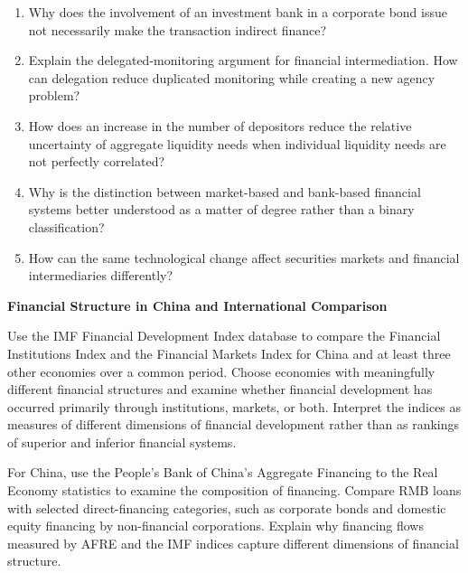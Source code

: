 \begin{enumerate}

\item Why does the involvement of an investment bank in a corporate bond issue not necessarily make the transaction indirect finance?

\item Explain the delegated-monitoring argument for financial intermediation. How can delegation reduce duplicated monitoring while creating a new agency problem?

\item How does an increase in the number of depositors reduce the relative uncertainty of aggregate liquidity needs when individual liquidity needs are not perfectly correlated?

\item Why is the distinction between market-based and bank-based financial systems better understood as a matter of degree rather than a binary classification?

\item How can the same technological change affect securities markets and financial intermediaries differently?

\end{enumerate}



\textbf{Financial Structure in China and International Comparison}

Use the IMF Financial Development Index database to compare the Financial Institutions Index and the Financial Markets Index for China and at least three other economies over a common period. Choose economies with meaningfully different financial structures and examine whether financial development has occurred primarily through institutions, markets, or both. Interpret the indices as measures of different dimensions of financial development rather than as rankings of superior and inferior financial systems.

For China, use the People's Bank of China's Aggregate Financing to the Real Economy statistics to examine the composition of financing. Compare RMB loans with selected direct-financing categories, such as corporate bonds and domestic equity financing by non-financial corporations. Explain why financing flows measured by AFRE and the IMF indices capture different dimensions of financial structure.

